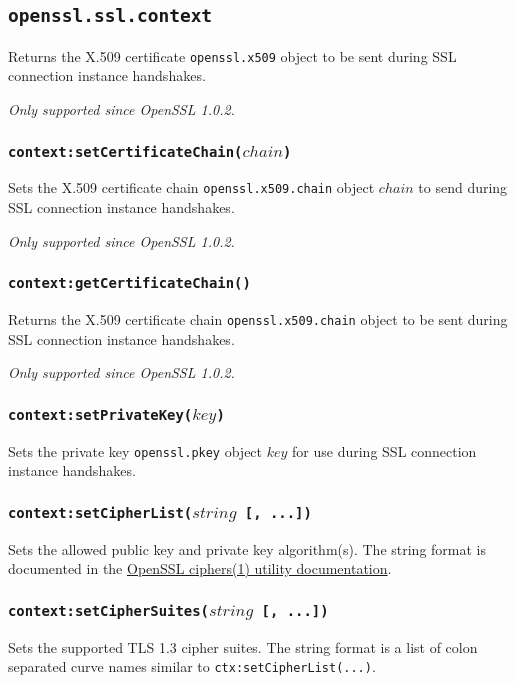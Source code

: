 \documentclass[11pt, oneside]{memoir}
\newcommand*{\fn}[1]{\texttt{#1}\xspace}
\newcommand*{\module}[1]{\texttt{#1}\xspace}
\newcounter{toccols}
\newenvironment{Module}[1]{
	\subsection{\texttt{#1}}
	\addtocontents{toc}{
		\protect\begin{multicols}{\value{toccols}}
	}
}{
	\addtocontents{toc}{\protect\end{multicols}}
}
\begin{document}
\begin{Module}{openssl.ssl.context}
Returns the X.509 certificate \module{openssl.x509} object to be sent during SSL connection instance handshakes.

\emph{Only supported since OpenSSL 1.0.2.}

\subsubsection[\fn{context:setCertificateChain}]{\fn{context:setCertificateChain($chain$)}}

Sets the X.509 certificate chain \module{openssl.x509.chain} object $chain$ to send during SSL connection instance handshakes.

\emph{Only supported since OpenSSL 1.0.2.}

\subsubsection[\fn{context:getCertificateChain}]{\fn{context:getCertificateChain()}}

Returns the X.509 certificate chain \module{openssl.x509.chain} object to be sent during SSL connection instance handshakes.

\emph{Only supported since OpenSSL 1.0.2.}

\subsubsection[\fn{context:setPrivateKey}]{\fn{context:setPrivateKey($key$)}}

Sets the private key \module{openssl.pkey} object $key$ for use during SSL connection instance handshakes.

\subsubsection[\fn{context:setCipherList}]{\fn{context:setCipherList($string$ [, ...])}}

Sets the allowed public key and private key algorithm(s). The string format is documented in the \href{http://www.openssl.org/docs/apps/ciphers.html#CIPHER_LIST_FORMAT}{OpenSSL ciphers(1) utility documentation}.

\subsubsection[\fn{context:setCipherSuites}]{\fn{context:setCipherSuites($string$ [, ...])}}

Sets the supported TLS 1.3 cipher suites. The string format is a list of colon separated curve names similar to \texttt{ctx:setCipherList(...)}.


\end{Module}
\end{document}

